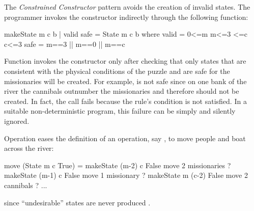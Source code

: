 The \emph{Constrained Constructor} pattern avoids
the creation of invalid states.
The programmer invokes the constructor indirectly
through the following function:
%
\begin{prog}
makeState m c b | valid \boolAnd safe = State m c b
   where valid = 0<=m \boolAnd m<=3 <=c \boolAnd c<=3
         safe  = m==3 || m==0 || m==c
\end{prog}
%
Function  invokes the constructor only
after checking that only states
that are consistent with the physical conditions of the
puzzle and are safe for the missionaries will be created.
For example, 
 is not safe since on one bank of the river
the cannibals outnumber the missionaries
and therefore should not be created.
In fact, the call  fails because
the rule's condition is not satisfied.
In a suitable non-deterministic program, this failure can be
simply and silently ignored.

Operation  eases the definition of an operation,
say , to move people and boat across the river:
%
\begin{prog}
move (State m c True)
   = makeState (m-2) c False      \lineComment move 2 missionaries
   ? makeState (m-1) c False      \lineComment move 1 missionary
   ? makeState m (c-2) False      \lineComment move 2 cannibals
   ? ...
\end{prog}
%
since ``undesirable'' states are never produced
.

% 
